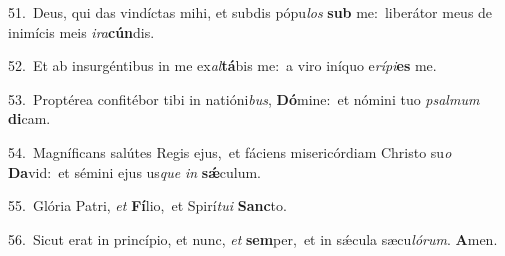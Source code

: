 {\numbfont\textcolor{\numbcolor}{51.}}~Deus, qui das vindíctas mihi, et subdis pópu\textit{los} \textbf{sub} me:~\star liberátor meus de inimícis meis \textit{i}\-\textit{ra}\textbf{cún}dis.\par
{\numbfont\textcolor{\numbcolor}{52.}}~Et ab insurgéntibus in me ex\-\textit{al}\-\textbf{tá}bis me:~\star a viro iníquo e\-\textit{rí}\-\textit{pi}\textbf{es} me.\par
{\numbfont\textcolor{\numbcolor}{53.}}~Proptérea confitébor tibi in natióni\-\textit{bus}\-, \textbf{Dó}\-mine:~\star et nómini tuo \textit{psal}\-\textit{mum} \textbf{di}\-cam.\par
{\numbfont\textcolor{\numbcolor}{54.}}~Magníficans salútes Regis ejus,~\dagger et fáciens misericórdiam Christo su\textit{o} \textbf{Da}\-vid:~\star et sémini ejus us\textit{que} \textit{in} \textbf{sǽ}\-culum.\par
{\numbfont\textcolor{\numbcolor}{55.}}~Glória Patri, \textit{et} \textbf{Fí}\-lio,~\star et Spirí\-\textit{tu}\-\textit{i} \textbf{Sanc}\-to.\par
{\numbfont\textcolor{\numbcolor}{56.}}~Sicut erat in princípio, et nunc, \textit{et} \textbf{sem}\-per,~\star et in sǽcula sæcu\-\textit{ló}\-\textit{rum}. \textbf{A}\-men.\par
